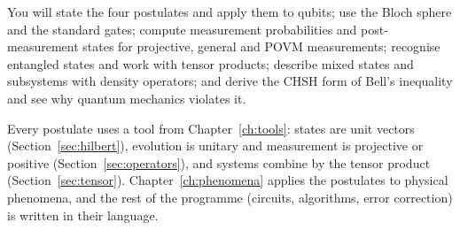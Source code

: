 \begin{objectives}
  You will state the four postulates and apply them to qubits; use the Bloch sphere and the
  standard gates; compute measurement probabilities and post-measurement states for
  projective, general and POVM measurements; recognise entangled states and work with
  tensor products; describe mixed states and subsystems with density operators;
  and derive the CHSH form of Bell's inequality and see why quantum mechanics violates it.
\end{objectives}

\begin{whereitsits}
  Every postulate uses a tool from Chapter~\ref{ch:tools}: states are unit vectors
  (Section~\ref{sec:hilbert}), evolution is unitary and measurement is projective or
  positive (Section~\ref{sec:operators}), and systems combine by the tensor product
  (Section~\ref{sec:tensor}). Chapter~\ref{ch:phenomena} applies the postulates to physical
  phenomena, and the rest of the programme (circuits, algorithms, error correction) is
  written in their language.
\end{whereitsits}









